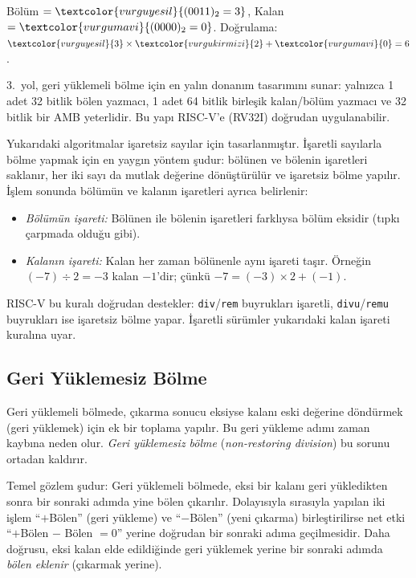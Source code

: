 \begin{ornek}[5.12]
Bölüm $= \textcolor{vurguyesil}{(0011)_2 = 3}$, \quad Kalan $= \textcolor{vurgumavi}{(0000)_2 = 0}$. Doğrulama: $\textcolor{vurguyesil}{3} \times \textcolor{vurgukirmizi}{2} + \textcolor{vurgumavi}{0} = 6$. \checkmark
\end{ornek}

3.\ yol, geri yüklemeli bölme için en yalın donanım tasarımını sunar: yalnızca 1 adet 32 bitlik bölen yazmacı, 1 adet 64 bitlik birleşik kalan/bölüm yazmacı ve 32 bitlik bir AMB yeterlidir. Bu yapı RISC-V'e (RV32I) doğrudan uygulanabilir.

\begin{bilginot}
Yukarıdaki algoritmalar işaretsiz sayılar için tasarlanmıştır. İşaretli sayılarla bölme yapmak için en yaygın yöntem şudur: bölünen ve bölenin işaretleri saklanır, her iki sayı da mutlak değerine dönüştürülür ve işaretsiz bölme yapılır. İşlem sonunda bölümün ve kalanın işaretleri ayrıca belirlenir:
\begin{itemize}[nosep]
  \item \emph{Bölümün işareti:} Bölünen ile bölenin işaretleri farklıysa bölüm eksidir (tıpkı çarpmada olduğu gibi).
  \item \emph{Kalanın işareti:} Kalan her zaman bölünenle aynı işareti taşır. Örneğin $(-7) \div 2 = -3$ kalan $-1$'dir; çünkü $-7 = (-3) \times 2 + (-1)$.
\end{itemize}
RISC-V bu kuralı doğrudan destekler: \texttt{div}/\texttt{rem} buyrukları işaretli, \texttt{divu}/\texttt{remu} buyrukları ise işaretsiz bölme yapar. İşaretli sürümler yukarıdaki kalan işareti kuralına uyar.
\end{bilginot}

\subsection{Geri Yüklemesiz Bölme}
\label{sec:geri-yuklemesiz-bolme}

Geri yüklemeli bölmede, çıkarma sonucu eksiyse kalanı eski değerine döndürmek (geri yüklemek) için ek bir toplama yapılır. Bu geri yükleme adımı zaman kaybına neden olur. \emph{Geri yüklemesiz bölme} (\emph{non-restoring division}) bu sorunu ortadan kaldırır.

Temel gözlem şudur: Geri yüklemeli bölmede, eksi bir kalanı geri yükledikten sonra bir sonraki adımda yine bölen çıkarılır. Dolayısıyla sırasıyla yapılan iki işlem ``$+$Bölen'' (geri yükleme) ve ``$-$Bölen'' (yeni çıkarma) birleştirilirse net etki ``$+$Bölen $-$ Bölen $= 0$'' yerine doğrudan bir sonraki adıma geçilmesidir. Daha doğrusu, eksi kalan elde edildiğinde geri yüklemek yerine bir sonraki adımda \emph{bölen eklenir} (çıkarmak yerine).

